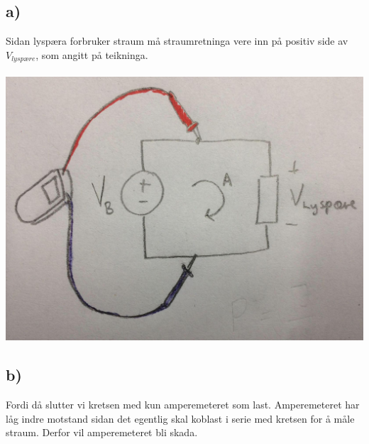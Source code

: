 \documentclass[12pt,a4paper]{article}
\begin{document}
		\subsection{a)}
		Sidan lyspæra forbruker straum må straumretninga vere inn på positiv
		side av $V_{lyspære}$, som angitt på teikninga. \\ \\
		\includegraphics[width=\textwidth]{01_9_a.png}

		\subsection{b)}
		Fordi då slutter vi kretsen med kun amperemeteret som last.
		Amperemeteret har låg indre motstand sidan det egentlig
		skal koblast i serie med kretsen for å måle straum.
		Derfor vil amperemeteret bli skada.
			
\end{document}
